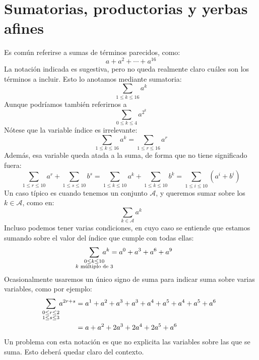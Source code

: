\section{Sumatorias, productorias y yerbas afines}
\label{sec:sumatorias-productorias}

  Es común referirse a sumas de términos parecidos,
  como:
  \begin{equation*}
    a + a^2 + \dotsb + a^{16}
  \end{equation*}
  La notación indicada es sugestiva,
  pero no queda realmente claro cuáles son los términos a incluir.
  Esto lo anotamos mediante sumatoria:
  \begin{equation*}
    \sum_{1 \le k \le 16} a^k
  \end{equation*}
  Aunque podríamos también referirnos a
    \begin{equation*}
    \sum_{0 \le k \le 4} a^{2^k}
  \end{equation*}
  Nótese que la variable índice es irrelevante:
  \begin{equation*}
    \sum_{1 \le k \le 16} a^k
      = \sum_{1 \le r \le 16} a^r
  \end{equation*}
  Además,
  esa variable queda atada a la suma,
  de forma que no tiene significado fuera:
  \begin{equation*}
    \sum_{1 \le r \le 10} a^r + \sum_{1 \le s \le 10} b^s
      = \sum_{1 \le k \le 10} a^k + \sum_{1 \le k \le 10} b^k
      = \sum_{1 \le i \le 10} \left( a^i + b^i \right)
  \end{equation*}
  Un caso típico es cuando tenemos un conjunto \(\mathcal{A}\),
  y queremos sumar sobre los \(k \in \mathcal{A}\),
  como en:
  \begin{equation*}
    \sum_{k \in \mathcal{A}} a^k
  \end{equation*}
  Incluso podemos tener varias condiciones,
  en cuyo caso se entiende
  que estamos sumando sobre el valor del índice
  que cumple con todas ellas:
  \begin{equation*}
    \sum_{\mathclap{\substack{
		      0 \le k \le 10 \\
		      k \text{\ múltiplo de 3}
	 }}} \; a^k
      = a^0 + a^3 + a^6 + a^9
  \end{equation*}
  Ocasionalmente usaremos un único signo de suma
  para indicar suma sobre varias variables,
  como por ejemplo:
  \begin{align*}
    \sum_{\mathclap{\substack{
		      0 \le r \le 2 \\
		      1 \le s \le 3
	 }}} \; a^{2 r + s}
      &= a^1 + a^2 + a^3 + a^3 + a^4 + a^5 + a^4 + a^5 + a^6 \\
      &= a + a^2 + 2 a^3 + 2 a^4 + 2 a^5 + a^6
  \end{align*}
  Un problema con esta notación es que no explicita
  las variables sobre las que se suma.
  Esto deberá quedar claro del contexto.

